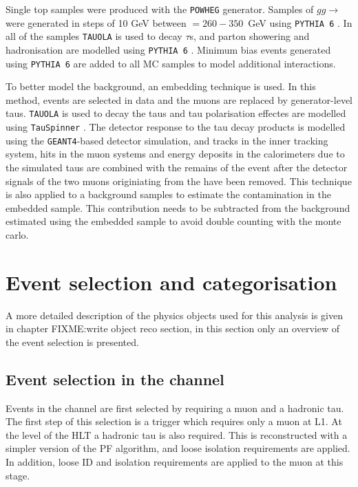 Single top samples were produced with the \texttt{POWHEG} \cite{powheg1,powheg2} generator. Samples of $gg\rightarrow$\Htohhtobbtautau
were generated in steps of 10 GeV between \mH $= 260 - 350$~GeV using \texttt{PYTHIA 6} \cite{pythia64}. In all of the samples
\texttt{TAUOLA} \cite{tauola} is used to decay $\tau$s, and parton showering and hadronisation are modelled using \texttt{PYTHIA 6} \cite{pythia64}.
Minimum bias events generated using \texttt{PYTHIA 6} are added to all MC samples to model additional
interactions. 

To better model the \Ztautau background, an embedding technique is used. In this method, 
\Zmm events are selected in data and the muons are replaced by generator-level taus. \texttt{TAUOLA} is used
to decay the taus and tau polarisation effectes are modelled using \texttt{TauSpinner} \cite{TauSpinner}. The detector
response to the tau decay products is modelled using the \texttt{GEANT4}-based \cite{Geant4} detector simulation, and 
tracks in the inner tracking system, hits in the muon systems and energy deposits in the calorimeters
due to the simulated taus are combined with the remains of the \Zmm event after the detector signals
of the two muons originiating from the \PZ have been removed. This technique is also applied to 
a \ttbar background samples to estimate the \ttbar contamination in the embedded sample. This contribution
needs to be subtracted from the \Ztautau background estimated using the embedded \Zmm sample to
avoid double counting with the \ttbar monte carlo.


\section{Event selection and categorisation}
\label{sec:hhh_selection}
A more detailed description of the physics objects used for this analysis is given in chapter FIXME:write object reco section, 
in this section only an overview of the event selection is presented.

\subsection{\texorpdfstring{Event selection in the \mutau channel}{Event selection in the mu-tau channel}}
\label{sec:hhh_selection_mutau}
Events in the \mutau channel are first selected by requiring a muon and a 
hadronic tau. The first step of this selection is a trigger which requires only a muon
at L1. At the level of the HLT a hadronic tau is also required. This is reconstructed
with a simpler version of the PF algorithm, and loose isolation requirements are 
applied. In addition, loose ID and isolation requirements are applied to the muon at 
this stage. 

